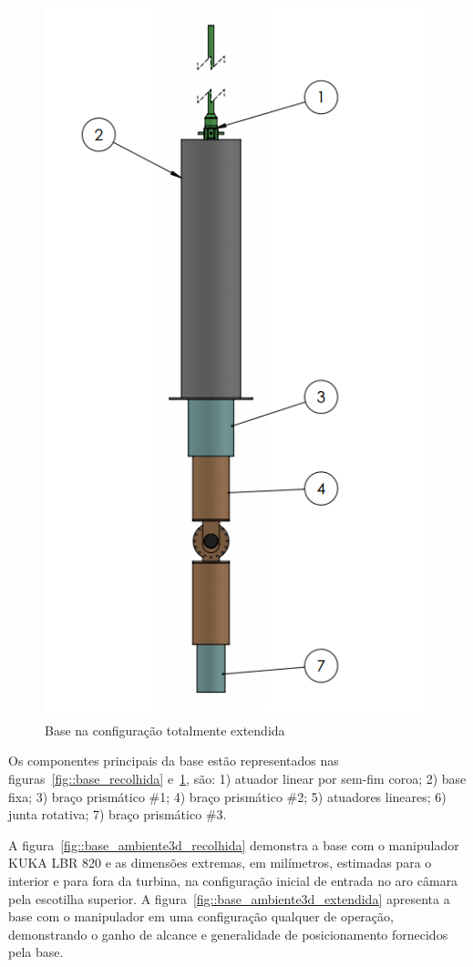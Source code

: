 \begin{figure}[h!]
\centering
	\includegraphics[width=0.6\columnwidth]{sota/figs/estudo/solid/Base_Extendida.PNG} 
	\caption{Base na configuração totalmente extendida}
	\label{fig::base_extendida}
\end{figure}

Os componentes principais da base estão representados nas
figuras~\ref{fig::base_recolhida} e~\ref{fig::base_extendida}, são: 1) atuador
linear por sem-fim coroa; 2) base fixa; 3) braço prismático \#1; 4) braço
prismático \#2; 5) atuadores lineares; 6) junta rotativa; 7) braço prismático
\#3.

A figura~\ref{fig::base_ambiente3d_recolhida} demonstra a base com o
manipulador KUKA LBR 820 e as dimensões extremas, em milímetros, estimadas para o
interior e para fora da turbina, na configuração inicial de entrada no aro
câmara pela escotilha superior.
A figura~\ref{fig::base_ambiente3d_extendida} apresenta a base com o manipulador
em uma configuração qualquer de operação, demonstrando o ganho de alcance e
generalidade de posicionamento fornecidos pela base.

